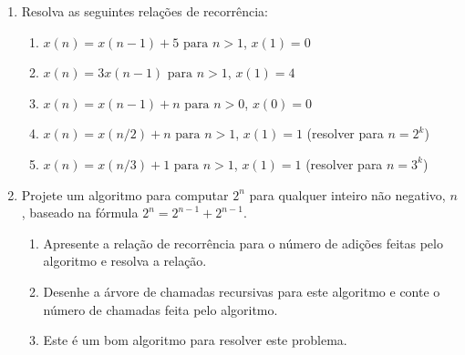 \documentclass{article}
\begin{document}
\begin{enumerate}
    
    
    
    
    \item Resolva as seguintes relações de recorrência:
    \begin{enumerate}
        \item $x(n) = x(n-1) + 5 \text{ para } n>1$, $x(1)=0$
        \item $x(n) = 3x(n-1)\text{ para } n>1$, $x(1)=4$
        \item $x(n) = x(n-1) + n \text{ para } n>0$, $x(0)=0$
        \item $x(n) = x(n/2) + n \text{ para } n>1$, $x(1)=1$ (resolver para $n = 2^k$)
        \item $x(n) = x(n/3) + 1 \text{ para } n>1$, $x(1)=1$ (resolver para $n = 3^k$)
    \end{enumerate}
    
    
    \item Projete um algoritmo para computar $2^n$ para qualquer inteiro não negativo, $n$, baseado na fórmula $2^n = 2^{n-1} + 2^{n-1}$.
    \begin{enumerate}
        \item Apresente a relação de recorrência para o número de adições feitas pelo algoritmo e resolva a relação.
        \item Desenhe a árvore de chamadas recursivas  para este algoritmo e conte o número de chamadas feita pelo algoritmo.
        \item Este é um bom algoritmo para resolver este problema.
    \end{enumerate}
    

\end{enumerate}
\end{document}
